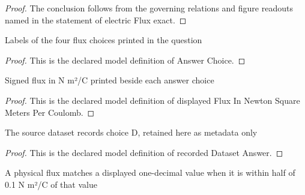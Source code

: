 \begin{proof}
  The conclusion follows from the governing relations and figure readouts named in the statement of electric Flux exact.
\end{proof}
\begin{definition}
  \label{def:physics:phyx-mini-0844:phyxminiproblems-problemphyxmini0844-answerchoice}
  Labels of the four flux choices printed in the question
\end{definition}
\begin{proof}
  This is the declared model definition of Answer Choice.
\end{proof}
\begin{definition}
  \label{def:physics:phyx-mini-0844:phyxminiproblems-problemphyxmini0844-displayedfluxinnewtonsquaremeterspercoulomb}
  Signed flux in N m²/C printed beside each answer choice
\end{definition}
\begin{proof}
  This is the declared model definition of displayed Flux In Newton Square Meters Per Coulomb.
\end{proof}
\begin{definition}
  \label{def:physics:phyx-mini-0844:phyxminiproblems-problemphyxmini0844-recordeddatasetanswer}
  The source dataset records choice D, retained here as metadata only
\end{definition}
\begin{proof}
  This is the declared model definition of recorded Dataset Answer.
\end{proof}
\begin{definition}
  \label{def:physics:phyx-mini-0844:phyxminiproblems-problemphyxmini0844-matchesdisplayedfluxtoonedecimalplace}
  A physical flux matches a displayed one-decimal value when it is within half of 0.1 N m²/C of that value
\end{definition}
